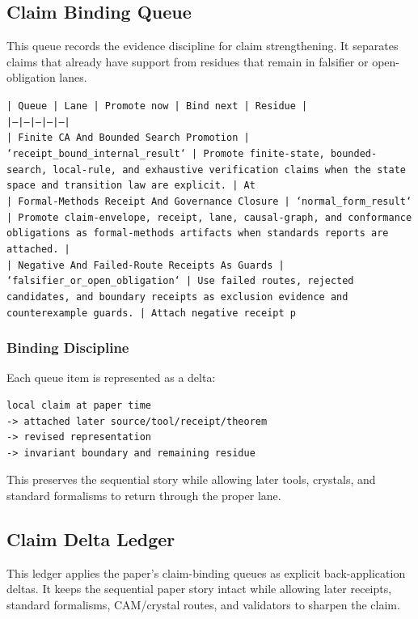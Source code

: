 \documentclass[11pt]{article}
\begin{document}
\subsection*{Claim Binding Queue}

This queue records the evidence discipline for claim strengthening. It separates claims that already have support from residues that remain in falsifier or open-obligation lanes.

\noindent\texttt{| Queue | Lane | Promote now | Bind next | Residue |}\\
\noindent\texttt{|---|---|---|---|---|}\\
\noindent\texttt{| Finite CA And Bounded Search Promotion | `receipt\_bound\_internal\_result` | Promote finite-state, bounded-search, local-rule, and exhaustive verification claims when the state space and transition law are explicit. | At}\\
\noindent\texttt{| Formal-Methods Receipt And Governance Closure | `normal\_form\_result` | Promote claim-envelope, receipt, lane, causal-graph, and conformance obligations as formal-methods artifacts when standards reports are attached. |}\\
\noindent\texttt{| Negative And Failed-Route Receipts As Guards | `falsifier\_or\_open\_obligation` | Use failed routes, rejected candidates, and boundary receipts as exclusion evidence and counterexample guards. | Attach negative receipt p}\\

\subsubsection*{Binding Discipline}

Each queue item is represented as a delta:

\begin{verbatim}
local claim at paper time
-> attached later source/tool/receipt/theorem
-> revised representation
-> invariant boundary and remaining residue
\end{verbatim}

This preserves the sequential story while allowing later tools, crystals, and
standard formalisms to return through the proper lane.

\subsection*{Claim Delta Ledger}

This ledger applies the paper's claim-binding queues as explicit back-application
deltas. It keeps the sequential paper story intact while allowing later
receipts, standard formalisms, CAM/crystal routes, and validators to sharpen the
claim.
\end{document}
